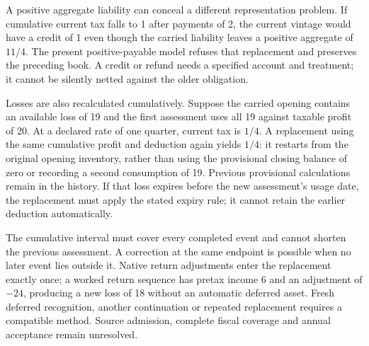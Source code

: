 A positive aggregate liability can conceal a different representation problem.
If cumulative current tax falls to 1 after payments of 2, the current vintage
would have a credit of 1 even though the carried liability leaves a positive
aggregate of $11/4$. The present positive-payable model refuses that replacement
and preserves the preceding book. A credit or refund needs a specified account
and treatment; it cannot be silently netted against the older obligation.

Losses are also recalculated cumulatively. Suppose the carried opening contains
an available loss of 19 and the first assessment uses all 19 against taxable
profit of 20. At a declared rate of one quarter, current tax is $1/4$. A
replacement using the same cumulative profit and deduction again yields $1/4$:
it restarts from the original opening inventory, rather than using the provisional
closing balance of zero or recording a second consumption of 19. Previous
provisional calculations remain in the history. If that loss expires before the
new assessment's usage date, the replacement must apply the stated expiry rule;
it cannot retain the earlier deduction automatically.

The cumulative interval must cover every completed event and cannot shorten the
previous assessment. A correction at the same endpoint is possible when no later
event lies outside it. Native return adjustments enter the replacement exactly
once; a worked return sequence has pretax income 6 and an adjustment of $-24$,
producing a new loss of 18 without an automatic deferred asset. Fresh deferred
recognition, another continuation or repeated replacement requires a compatible
method. Source admission, complete fiscal coverage and annual acceptance remain
unresolved.
